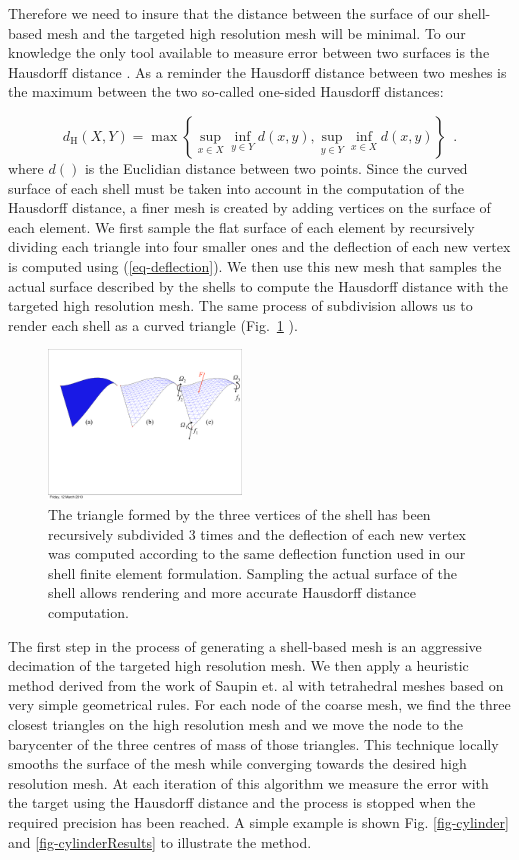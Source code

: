 \documentclass{llncs}
\begin{document}
Therefore we need to insure that the distance between the surface of our shell-based mesh and the targeted high resolution mesh will be minimal. To our knowledge the only tool available to measure error between two surfaces is the Hausdorff distance \cite{Klein96,Cignoni98}. As a reminder the Hausdorff distance between two meshes is the maximum between the two so-called one-sided Hausdorff distances:

\begin{equation}
d_{\mathrm{H}}(X,Y) = \max \left\{ \sup_{x \in X} \inf_{y \in Y} d(x,y), \sup_{y \in Y} \inf_{x \in X} d(x,y) \right\} \enspace .
\end{equation}
where $d()$ is the Euclidian distance between two points. Since the curved surface of each shell must be taken into account in the computation of the Hausdorff distance, a finer mesh is created by adding vertices on the surface of each element. We first sample the flat surface of each element by recursively dividing each triangle into four smaller ones and the deflection of each new vertex is computed using (\ref{eq-deflection}). We then use this new mesh that samples the actual surface described by the shells to compute the Hausdorff distance with the targeted high resolution mesh. The same process of subdivision allows us to render each shell as a curved triangle (Fig.~\ref{fig-shell} ). 

\begin{figure}
\centering
\includegraphics[height=4cm]{images/shell_curvature}
\caption {The triangle formed by the three vertices of the shell has been recursively subdivided 3 times and the deflection of each new vertex was computed according to the same deflection function used in our shell finite element formulation. Sampling the actual surface of the shell allows rendering and more accurate Hausdorff distance computation. }
\label{fig-shell}
\end{figure}

The first step in the process of generating a shell-based mesh is an aggressive decimation of the targeted high resolution mesh. We then apply a heuristic method derived from the work of Saupin et. al \cite{Saupin07} with tetrahedral meshes based on very simple geometrical rules. For each node of the coarse mesh, we find the three closest triangles on the high resolution mesh and we move the node to the barycenter of the three centres of mass of those triangles. This technique locally smooths the surface of the mesh while converging towards the desired high resolution mesh. At each iteration of this algorithm we measure the error with the target using the Hausdorff distance and the process is stopped when the required precision has been reached. A simple example is shown Fig. \ref{fig-cylinder} and \ref{fig-cylinderResults} to illustrate the method. 
\end{document}
